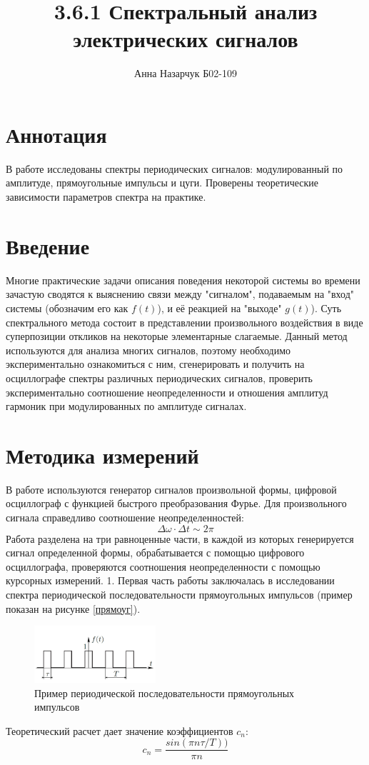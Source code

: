 \documentclass[a4paper,12pt]{article} %
\author{Анна Назарчук Б02-109}
\title{3.6.1 Спектральный анализ электрических сигналов}
\date{}
\begin{document}
\maketitle
\section{Аннотация}
В работе исследованы спектры периодических сигналов: модулированный по амплитуде, прямоугольные импульсы и цуги. Проверены теоретические зависимости параметров спектра на практике.


\section{Введение}
Многие практические задачи описания поведения некоторой системы во времени зачастую сводятся к выяснению связи между "сигналом", подаваемым на "вход"
системы (обозначим его как $f(t)$), и её реакцией на "выходе" $g(t)$). Суть спектрального метода состоит в представлении произвольного воздействия в виде суперпозиции откликов на некоторые элементарные слагаемые. Данный метод используются для анализа многих сигналов, поэтому необходимо экспериментально ознакомиться с ним, сгенерировать и получить на осциллографе спектры различных периодических сигналов, проверить экспериментально соотношение неопределенности и отношения амплитуд гармоник при модулированных по амплитуде сигналах.

\section{Методика измерений}
В работе используются генератор сигналов произвольной формы, цифровой осциллограф с функцией быстрого преобразования Фурье. Для произвольного сигнала справедливо соотношение неопределенностей:
\begin{equation}
\Delta \omega \cdot \Delta t \sim 2\pi
\end{equation}
Работа разделена на три равноценные части, в каждой из которых генерируется сигнал определенной формы, обрабатывается с помощью цифрового осциллографа, проверяются соотношения неопределенности с помощью курсорных измерений.
1. Первая часть работы заключалась в исследовании спектра периодической последовательности прямоугольных импульсов (пример показан на рисунке \ref{прямоуг}). 
\begin{figure}[h!]
\includegraphics[width=0.4\textwidth]{rect}
\caption{Пример периодической последовательности прямоугольных импульсов} \label{rect}
\end{figure}
Теоретический расчет дает значение коэффициентов $c_n$:
\begin{equation}
c_n  = \dfrac{sin(\pi n \tau / T))}{\pi n}
\end{equation}
\end{document}
